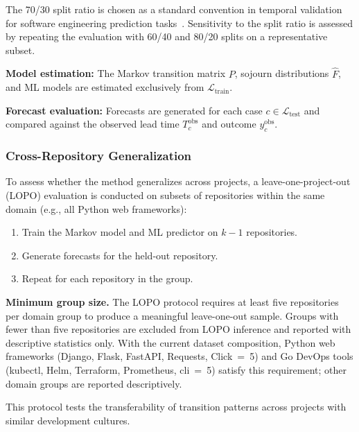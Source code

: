 The 70/30 split ratio is chosen as a standard convention in temporal 
validation for software engineering prediction 
tasks~\cite{tashman2000out}. Sensitivity to the split ratio is assessed 
by repeating the evaluation with 60/40 and 80/20 splits on a 
representative subset.

\textbf{Model estimation:} The Markov transition matrix $P$, sojourn 
distributions $\hat{F}$, and ML models are estimated exclusively from 
$\mathcal{L}_{\text{train}}$.

\textbf{Forecast evaluation:} Forecasts are generated for each case 
$c \in \mathcal{L}_{\text{test}}$ and compared against the observed 
lead time $T_c^{\text{obs}}$ and outcome $y_c^{\text{obs}}$.


\subsubsection{Cross-Repository Generalization}
\label{sec:cross-repo}

To assess whether the method generalizes across projects, a
leave-one-project-out (LOPO) evaluation is conducted on subsets of
repositories within the same domain (e.g., all Python web frameworks):

\begin{enumerate}
    \item Train the Markov model and ML predictor on $k-1$ repositories.
    \item Generate forecasts for the held-out repository.
    \item Repeat for each repository in the group.
\end{enumerate}

\noindent\textbf{Minimum group size.} The LOPO protocol requires at
least five repositories per domain group to produce a meaningful
leave-one-out sample. Groups with fewer than five repositories are
excluded from LOPO inference and reported with descriptive statistics
only. With the current dataset composition, Python web frameworks
(Django, Flask, FastAPI, Requests, Click~=~5) and Go DevOps tools
(kubectl, Helm, Terraform, Prometheus, cli~=~5) satisfy this
requirement; other domain groups are reported descriptively.

This protocol tests the transferability of transition patterns across
projects with similar development cultures.



